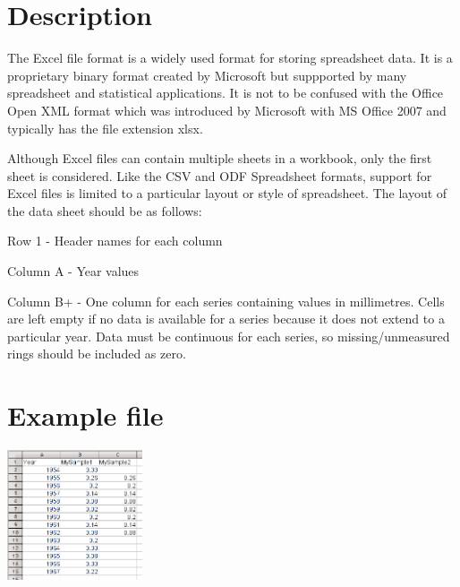 \section{Description}
The Excel file format is a widely used format for storing spreadsheet data. It is a proprietary binary format created by Microsoft but suppported by many spreadsheet and statistical applications.  It is not to be confused with the Office Open XML format which was introduced by Microsoft with MS Office 2007 and typically has the file extension xlsx.

Although Excel files can contain multiple sheets in a workbook, only the first sheet is considered.  Like the CSV and ODF Spreadsheet formats, support for Excel files is limited to a particular layout or style of spreadsheet. The layout of the data sheet should be as follows:

\begin{itemize*}
 \item Row 1 - Header names for each column
 \item Column A - Year values
 \item Column B+ - One column for each series containing values in millimetres. Cells are left empty if no data is available for a series because it does not extend to a particular year. Data must be continuous for each series, so missing/unmeasured rings should be included as zero.
\end{itemize*}

\section{Example file}

\includegraphics[width=4cm]{excel.png}



